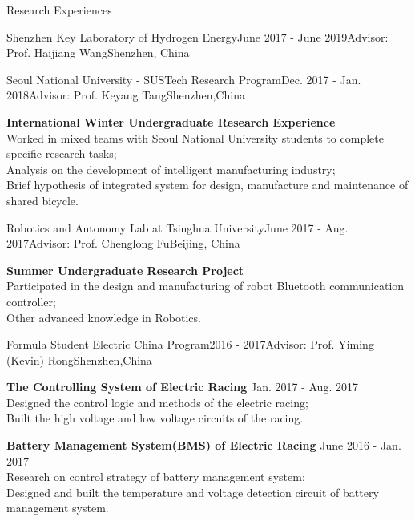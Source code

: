 \documentclass{resume} %
\begin{document}
\begin{rSection}{Research Experiences}
\begin{rSubsection}{Shenzhen Key Laboratory of Hydrogen Energy}{June 2017 - June 2019}{Advisor: Prof. Haijiang Wang}{Shenzhen, China}
    \end{rSubsection}

    \begin{rSubsection}{Seoul National University - SUSTech Research Program}{Dec. 2017 - Jan. 2018}{Advisor: Prof. Keyang Tang}{Shenzhen,China}
        \vspace{-4pt}
        \item \textbf{International Winter Undergraduate Research Experience} \\
        Worked in mixed teams with Seoul National University students to complete specific research tasks;\\ 
        Analysis on the development of intelligent manufacturing industry; \\
        Brief hypothesis of integrated system for design, manufacture and maintenance of shared bicycle.
    \end{rSubsection}

    \begin{rSubsection}{Robotics and Autonomy Lab at Tsinghua University}{June 2017 - Aug. 2017}{Advisor: Prof. Chenglong Fu}{Beijing, China}
        \vspace{-4pt}
        \item \textbf{Summer Undergraduate Research Project} \\
        Participated in the design and manufacturing of robot Bluetooth communication controller; \\
        Other advanced knowledge in Robotics.
    \end{rSubsection}

    \begin{rSubsection}{Formula Student Electric China Program}{2016 - 2017}{Advisor: Prof. Yiming (Kevin) Rong}{Shenzhen,China}
        \vspace{-4pt}
        \item \textbf{The Controlling System of Electric Racing}  \hfill { Jan. 2017 - Aug. 2017}\\
        Designed the control logic and methods of the electric racing;\\
        Built the high voltage and low voltage circuits of the racing.
        \item \textbf{Battery Management System(BMS) of Electric Racing}  \hfill { June 2016 - Jan. 2017}\\
        Research on control strategy of battery management system; \\
        Designed and built the temperature and voltage detection circuit of battery management system.

    \end{rSubsection}
 
\end{rSection}
\end{document}

